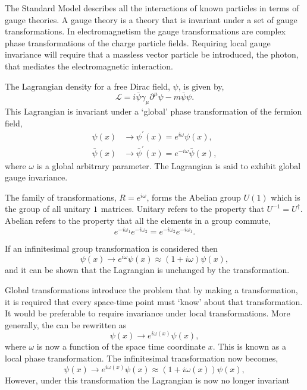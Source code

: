 The {Standard Model} describes all the interactions of known particles in terms
of gauge theories. A gauge theory is a theory that is invariant under a set of
gauge transformations.  In electromagnetism the gauge transformations are
complex phase transformations of the charge particle fields. Requiring local
gauge invariance will require that a massless vector particle be introduced, the
photon, that mediates the electromagnetic interaction.

The Lagrangian density for a free Dirac field, $\psi$, is given by,
\begin{equation}
\mathcal{L} = i \bar{\psi} \gamma_{\mu} \partial^{\mu} \psi - m \bar{\psi}\psi .
\end{equation}
This Lagrangian is invariant under a `global' phase transformation of the
fermion field,
\begin{align}
\psi(x)       &\to \psi^{\prime}(x) = e^{i\omega} \psi(x), \label{eq:global} \\
\bar{\psi}(x) &\to \bar{\psi}^{\prime}(x) = e^{-i\omega}\bar{\psi}(x),
\end{align}
where $\omega$ is a global arbitrary parameter. 
The Lagrangian is said to exhibit global gauge invariance. 

The family of transformations, $R = e^{i \omega}$, forms the
Abelian group $U(1)$ which is the group of all unitary $1\time1$ matrices.
Unitary refers to the property that $U^{-1} = {U}^{\dagger}$.
Abelian refers to the property that all the elements in a
group commute, 
\begin{equation}
e^{-i\omega_1} 
e^{-i\omega_2} 
=
e^{-i\omega_2} 
e^{-i\omega_1} .
\end{equation}

If an infinitesimal group transformation is considered then 
\begin{equation}
\psi(x) 
\to e^{i\omega} \psi(x)
\approx (1+i\omega)\psi(x),
\end{equation}
and it can be shown that the Lagrangian is unchanged by the
transformation\cite{halzen1984quarks}.

Global transformations introduce the problem that by making a transformation, it
is required that every space-time point must `know' about that transformation. It would be
preferable to require invariance under local transformations.
More generally, the  can be rewritten as
\begin{equation}
\psi(x) \to e^{i\omega(x)} \psi(x),
\label{eq:local}
\end{equation}
where $\omega$ is now a function of the space time coordinate $x$. This is known
as a local phase transformation. The infinitesimal transformation now becomes,
\begin{equation}
\psi(x) 
\to e^{i\omega(x)} \psi(x)
\approx (1+i\omega(x))\psi(x),
\end{equation}
However, under this transformation the Lagrangian is now no longer
invariant 

